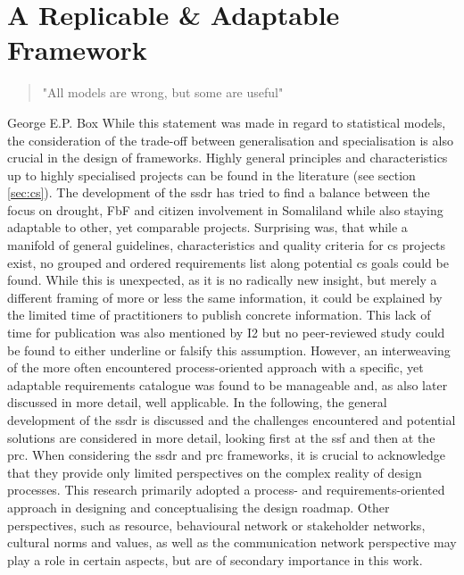 \section{A Replicable \& Adaptable Framework}
\vspace{\baselineskip}
\begin{quote}
    "All models are wrong, but some are useful"
\end{quote}
\hfill {\footnotesize George E.P. Box}
\vspace{\baselineskip}
While this statement was made in regard to statistical models, the consideration of the trade-off between generalisation and specialisation is also crucial in the design of frameworks. Highly general principles and characteristics up to highly specialised projects can be found in the literature (see section \ref{sec:cs}). The development of the \acrshort{ssdr} has tried to find a balance between the focus on drought, FbF and citizen involvement in Somaliland while also staying adaptable to other, yet comparable projects.\newline
Surprising was, that while a manifold of general guidelines, characteristics and quality criteria for \acrlong{cs} projects exist, no grouped and ordered requirements list along potential \acrshort{cs} goals could be found. While this is unexpected, as it is no radically new insight, but merely a different framing of more or less the same information, it could be explained by the limited time of practitioners to publish concrete information. This lack of time for publication was also mentioned by I2 but no peer-reviewed study could be found to either underline or falsify this assumption. However, an interweaving of the more often encountered process-oriented approach with a specific, yet adaptable requirements catalogue was found to be manageable and, as also later discussed in more detail, well applicable.\newline
In the following, the general development of the \acrshort{ssdr} is discussed and the challenges encountered and potential solutions are considered in more detail, looking first at the \acrshort{ssf} and then at the \acrshort{prc}. When considering the \acrshort{ssdr} and \acrshort{prc} frameworks, it is crucial to acknowledge that they provide only limited perspectives on the complex reality of design processes. This research primarily adopted a process- and requirements-oriented approach in designing and conceptualising the design roadmap. Other perspectives, such as resource, behavioural network or stakeholder networks, cultural norms and values, as well as the communication network perspective may play a role in certain aspects, but are of secondary importance in this work.\newline
